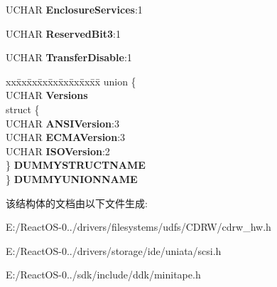 \begin{DoxyCompactItemize}
U\+C\+H\+AR {\bfseries Enclosure\+Services}\+:1
\item 
\mbox{\label{struct___i_n_q_u_i_r_y_d_a_t_a_a41e089c193fbb93456b14ae58d125c7e}} 
U\+C\+H\+AR {\bfseries Reserved\+Bit3}\+:1
\item 
\mbox{\label{struct___i_n_q_u_i_r_y_d_a_t_a_a11751bd9752de00d220221c24b0ba5e7}} 
U\+C\+H\+AR {\bfseries Transfer\+Disable}\+:1
\item 
\mbox{\label{struct___i_n_q_u_i_r_y_d_a_t_a_ad4fc29612c86102d06167053b85f6911}} 
\begin{tabbing}
xx\=xx\=xx\=xx\=xx\=xx\=xx\=xx\=xx\=\kill
union \{\\
\>UCHAR {\bfseries Versions}\\
\>struct \{\\
\>\>UCHAR {\bfseries ANSIVersion}:3\\
\>\>UCHAR {\bfseries ECMAVersion}:3\\
\>\>UCHAR {\bfseries ISOVersion}:2\\
\>\} {\bfseries DUMMYSTRUCTNAME}\\
\} {\bfseries DUMMYUNIONNAME}\\

\end{tabbing}\end{DoxyCompactItemize}


该结构体的文档由以下文件生成\+:\begin{DoxyCompactItemize}
\item 
E\+:/\+React\+O\+S-\/0../drivers/filesystems/udfs/\+C\+D\+R\+W/cdrw\+\_\+hw.\+h\item 
E\+:/\+React\+O\+S-\/0../drivers/storage/ide/uniata/scsi.\+h\item 
E\+:/\+React\+O\+S-\/0../sdk/include/ddk/minitape.\+h\end{DoxyCompactItemize}
